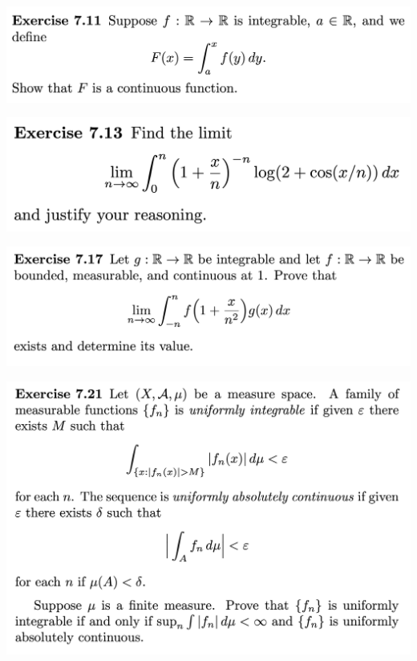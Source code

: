 \begin{mdframed}
\includegraphics[width=400pt]{img/analysis--berkeley-202a-hw08-d0c0.png}
\end{mdframed}

\begin{mdframed}
\includegraphics[width=400pt]{img/analysis--berkeley-202a-hw08-9931.png}
\end{mdframed}


\begin{mdframed}
\includegraphics[width=400pt]{img/analysis--berkeley-202a-hw08-6e60.png}
\end{mdframed}


\begin{mdframed}
\includegraphics[width=400pt]{img/analysis--berkeley-202a-hw08-337f.png}
\end{mdframed}